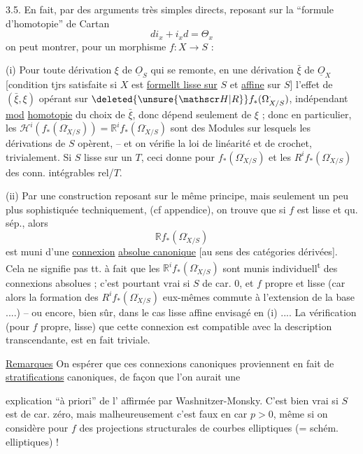 3.5. En fait, par des arguments très simples directs,  reposant sur la ``formule d'homotopie'' de Cartan
\[
d i_x+i_x d=\Theta_x
\]
on peut montrer, pour un morphisme $f:X\longrightarrow S$ :

(i) Pour toute dérivation $\xi$ de $\underline O_S$ qui se remonte,   en une dérivation $\bar\xi$ de $\underline O_X$ [condition tjrs satisfaite si $X$ est  \uline{formellt lisse sur} $S$ et \uline{affine} sur $S$] l'effet de $(\bar\xi,\xi)$ opérant sur $\deleted{\unsure{\mathscr H|R}} f_*(\Omega^{\cdot}_{X/S})$,  indépendant \uline{mod} \uline{homotopie}  du choix de $\bar\xi$, donc dépend seulement de $\xi$ ; donc en particulier,  les $\mathscr H^i(f_*(\Omega^{\cdot}_{X/S}))=\mathbb R^i f_*(\Omega^{\cdot}_{X/S})$ sont des Modules sur lesquels les dérivations de $S$ opèrent, -- et on vérifie la loi de linéarité et de crochet, trivialement. Si $S$ lisse sur un $T$, ceci donne pour $f_*(\Omega^{\cdot}_{X/S})$ et  les $R^i f_*(\Omega^{\cdot}_{X/S})$ des conn. intégrables rel/$T$.

(ii) Par une construction reposant  sur le même principe, mais seulement un peu plus sophistiquée techniquement, (cf appendice), on trouve que si $f$ est lisse  et qu. sép., alors
\[
\mathbb R f_*(\Omega^{\cdot}_{X/S})
\]
est muni d'une \uline{connexion} \uline{absolue canonique} [au sens des catégories dérivées]. Cela ne signifie pas tt. à fait que les $\mathbb R^i f_*(\Omega^{\cdot}_{X/S})$ sont munis individuell\textsuperscript{t} des connexions absolues ; c'est pourtant vrai si $S$ de car. $0$, et $f$ propre et lisse (car alors la formation des $R^i f_*(\Omega^{\cdot}_{X/S})$ eux-mêmes commute à l'extension de la base ....) -- ou encore, bien sûr, dans le cas lisse affine envisagé en (i) .... La vérification (pour $f$ propre, lisse) que cette connexion est compatible avec la description transcendante, est en fait triviale.

\uline{Remarques} On  espérer que ces connexions canoniques proviennent en fait de \uline{stratifications} canoniques, de façon que l'on aurait une

explication ``à priori'' de l'  affirmée par Washnitzer-Monsky. C'est bien vrai si $S$ est de car. zéro, mais malheureusement c'est faux en car $p>0$, même si on considère pour $f$ des projections structurales de  courbes elliptiques (= schém. elliptiques) !

